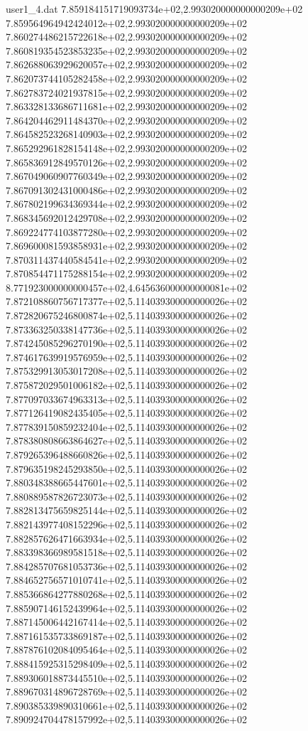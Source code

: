 \begin{filecontents}{user1_4.dat}
7.859184151719093734e+02,2.993020000000000209e+02
7.859564964942424012e+02,2.993020000000000209e+02
7.860274486215722618e+02,2.993020000000000209e+02
7.860819354523853235e+02,2.993020000000000209e+02
7.862688063929620057e+02,2.993020000000000209e+02
7.862073744105282458e+02,2.993020000000000209e+02
7.862783724021937815e+02,2.993020000000000209e+02
7.863328133686711681e+02,2.993020000000000209e+02
7.864204462911484370e+02,2.993020000000000209e+02
7.864582523268140903e+02,2.993020000000000209e+02
7.865292961828154148e+02,2.993020000000000209e+02
7.865836912849570126e+02,2.993020000000000209e+02
7.867049060907760349e+02,2.993020000000000209e+02
7.867091302431000486e+02,2.993020000000000209e+02
7.867802199634369344e+02,2.993020000000000209e+02
7.868345692012429708e+02,2.993020000000000209e+02
7.869224774103877280e+02,2.993020000000000209e+02
7.869600081593858931e+02,2.993020000000000209e+02
7.870311437440584541e+02,2.993020000000000209e+02
7.870854471175288154e+02,2.993020000000000209e+02
8.771923000000000457e+02,4.645636000000000081e+02
7.872108860756717377e+02,5.114039300000000026e+02
7.872820675246800874e+02,5.114039300000000026e+02
7.873363250338147736e+02,5.114039300000000026e+02
7.874245085296270190e+02,5.114039300000000026e+02
7.874617639919576959e+02,5.114039300000000026e+02
7.875329913053017208e+02,5.114039300000000026e+02
7.875872029501006182e+02,5.114039300000000026e+02
7.877097033674963313e+02,5.114039300000000026e+02
7.877126419082435405e+02,5.114039300000000026e+02
7.877839150859232404e+02,5.114039300000000026e+02
7.878380808663864627e+02,5.114039300000000026e+02
7.879265396488660826e+02,5.114039300000000026e+02
7.879635198245293850e+02,5.114039300000000026e+02
7.880348388665447601e+02,5.114039300000000026e+02
7.880889587826723073e+02,5.114039300000000026e+02
7.882813475659825144e+02,5.114039300000000026e+02
7.882143977408152296e+02,5.114039300000000026e+02
7.882857626471663934e+02,5.114039300000000026e+02
7.883398366989581518e+02,5.114039300000000026e+02
7.884285707681053736e+02,5.114039300000000026e+02
7.884652756571010741e+02,5.114039300000000026e+02
7.885366864277880268e+02,5.114039300000000026e+02
7.885907146152439964e+02,5.114039300000000026e+02
7.887145006442167414e+02,5.114039300000000026e+02
7.887161535733869187e+02,5.114039300000000026e+02
7.887876102084095464e+02,5.114039300000000026e+02
7.888415925315298409e+02,5.114039300000000026e+02
7.889306018873445510e+02,5.114039300000000026e+02
7.889670314896728769e+02,5.114039300000000026e+02
7.890385339890310661e+02,5.114039300000000026e+02
7.890924704478157992e+02,5.114039300000000026e+02

\end{filecontents}
